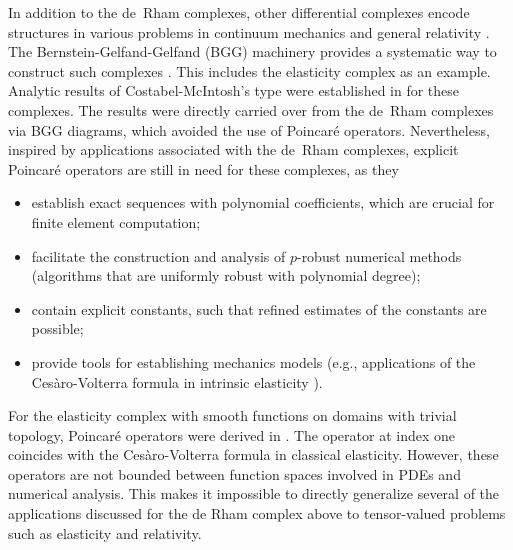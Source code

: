 \documentclass[11pt]{amsart}
\newcommand{\0}{\mathaccent23}
\begin{document}
In addition to the de~Rham complexes, other differential complexes encode structures in various problems in continuum mechanics   \cite{amstutz2019incompatibility,angoshtari2015differential,kroner1995dislocations} and general relativity \cite{beig2020linearised,quenneville2015new}. The Bernstein-Gelfand-Gelfand (BGG) machinery provides a systematic way to construct such complexes \cite{arnold2021complexes,vcap2022bgg,vcap2001bernstein,eastwood2000complex}. This includes the elasticity complex as an example. Analytic results of Costabel-McIntosh's type were established in \cite{arnold2021complexes,vcap2022bgg}  for these complexes. The results were directly carried over from the de~Rham complexes via BGG diagrams, which avoided the use of Poincar\'e operators. Nevertheless, inspired by applications associated with the de~Rham complexes, explicit Poincar\'e operators are still in need for these complexes, as they
\begin{itemize}
\item establish exact sequences with polynomial coefficients, which are crucial for finite element computation;
\item facilitate the construction and analysis of $p$-robust numerical methods (algorithms that are uniformly robust with polynomial degree);
\item contain explicit constants, such that refined estimates of the constants are possible;
\item provide tools for establishing mechanics models (e.g., applications of the  Ces\`aro-Volterra formula in intrinsic elasticity \cite{ciarlet2009intrinsic}).
\end{itemize}
For the elasticity complex with smooth functions on domains with trivial topology, Poincar\'e operators were derived in \cite{christiansen2020poincare}. 
The operator at index one coincides with the Ces\`aro-Volterra formula in classical elasticity. However, these operators are not bounded between function spaces involved in PDEs and numerical analysis. This makes it impossible to directly generalize several of the applications discussed for the de Rham complex above to tensor-valued problems such as elasticity and relativity. 

\end{document}
